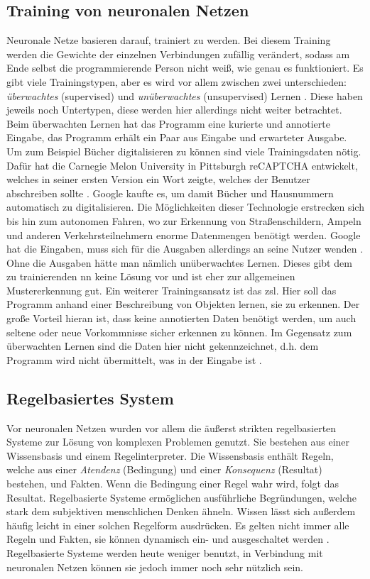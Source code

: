 \subsection{Training von neuronalen Netzen}
Neuronale Netze basieren darauf, trainiert zu werden.
Bei diesem Training werden die Gewichte der einzelnen Verbindungen zufällig verändert, sodass am Ende selbst die programmierende Person nicht weiß, wie genau es funktioniert.
Es gibt viele Trainingstypen, aber es wird vor allem zwischen zwei unterschieden: \emph{überwachtes} (supervised) und \emph{unüberwachtes} (unsupervised) Lernen \citep{mllearning}.
Diese haben jeweils noch Untertypen, diese werden hier allerdings nicht weiter betrachtet.
Beim überwachten Lernen hat das Programm eine kurierte und annotierte Eingabe, das Programm erhält ein Paar aus Eingabe und erwarteter Ausgabe.
Um zum Beispiel Bücher digitalisieren zu können sind viele Trainingsdaten nötig.
Dafür hat die Carnegie Melon University in Pittsburgh reCAPTCHA entwickelt, welches in seiner ersten Version ein Wort zeigte, welches der Benutzer abschreiben sollte \citep{recaptchabooks}.
Google kaufte es, um damit Bücher und Hausnummern automatisch zu digitalisieren.
Die Möglichkeiten dieser Technologie erstrecken sich bis hin zum autonomen Fahren, wo zur Erkennung von Straßenschildern, Ampeln und anderen Verkehrsteilnehmern enorme Datenmengen benötigt werden.
Google hat die Eingaben, muss sich für die Ausgaben allerdings an seine Nutzer wenden \citep{recaptchaav}.
Ohne die Ausgaben hätte man nämlich unüberwachtes Lernen.
Dieses gibt dem zu trainierenden \ac{nn} keine Lösung vor und ist eher zur allgemeinen Mustererkennung gut.
Ein weiterer Trainingsansatz ist das \ac{zsl}.
Hier soll das Programm anhand einer Beschreibung von Objekten lernen, sie zu erkennen.
Der große Vorteil hieran ist, dass keine annotierten Daten benötigt werden, um auch seltene oder neue Vorkommnisse sicher erkennen zu können.
Im Gegensatz zum überwachten Lernen sind die Daten hier nicht gekennzeichnet, d.h. dem Programm wird nicht übermittelt, was in der Eingabe ist \citep{zsl}.

\subsection{Regelbasiertes System}
Vor neuronalen Netzen wurden vor allem die äußerst strikten regelbasierten Systeme zur Lösung von komplexen Problemen genutzt.
Sie bestehen aus einer Wissensbasis und einem Regelinterpreter.
Die Wissensbasis enthält Regeln, welche aus einer \emph{Atendenz} (Bedingung) und einer \emph{Konsequenz} (Resultat) bestehen, und Fakten.
Wenn die Bedingung einer Regel wahr wird, folgt das Resultat.
Regelbasierte Systeme ermöglichen ausführliche Begründungen, welche stark dem subjektiven menschlichen Denken ähneln.
Wissen lässt sich außerdem häufig leicht in einer solchen Regelform ausdrücken.
Es gelten nicht immer alle Regeln und Fakten, sie können dynamisch ein- und ausgeschaltet werden \citep{rulebasedsystem}.
Regelbasierte Systeme werden heute weniger benutzt, in Verbindung mit neuronalen Netzen können sie jedoch immer noch sehr nützlich sein.
